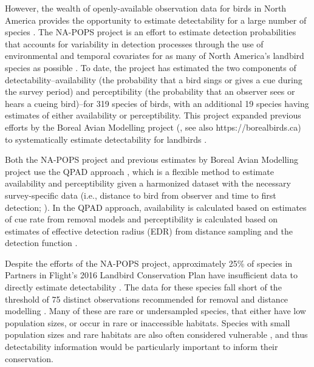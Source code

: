 \documentclass[12pt]{article}
\begin{document}
\par However, the wealth of openly-available observation data for birds in North America provides the opportunity to estimate detectability for a large number of species \citep{bennett_how_2024}. 
The NA-POPS project is an effort to estimate detection probabilities that accounts for variability in detection processes through the use of environmental and temporal covariates for as many of North America’s landbird species as possible \citep{edwards_point_2023}.
To date, the project has estimated the two components of detectability--availability (the probability that a bird sings or gives a cue during the survey period) and perceptibility (the probability that an observer sees or hears a cueing bird)--for 319 species of birds, with an additional 19 species having estimates of either availability or perceptibility. 
This project expanded previous efforts by the Boreal Avian Modelling project (\citet{cumming_toward_2010}, see also https://borealbirds.ca) to systematically estimate detectability for landbirds \citep{solymos_calibrating_2013, solymos_evaluating_2018}.

\par Both the NA-POPS project and previous estimates by Boreal Avian Modelling project use the QPAD approach \citep{solymos_calibrating_2013}, which is a flexible method to estimate availability and perceptibility given a harmonized dataset with the necessary survey-specific data (i.e., distance to bird from observer and time to first detection; \citep{barker_ecological_2015}).
In the QPAD approach, availability is calculated based on estimates of cue rate from removal models \citep{farnsworth_removal_2002, alldredge_time--detection_2007} and perceptibility is calculated based on estimates of effective detection radius (EDR) from distance sampling and the detection function \citep{buckland_introduction_2001}.

\par Despite the efforts of the NA-POPS project, approximately 25\% of species in Partners in Flight’s 2016 Landbird Conservation Plan \citep{rosenberg_partners_2016} have insufficient data to directly estimate detectability \citep{edwards_point_2023}.
The data for these species fall short of the threshold of 75 distinct observations recommended for removal and distance modelling \citep{buckland_introduction_2001, solymos_calibrating_2013}. 
Many of these are rare or undersampled species, that either have low population sizes, or occur in rare or inaccessible habitats.
Species with small population sizes and rare habitats are also often considered vulnerable \citep{davies_synergistic_2004, gray_effects_1989, segura_specialist_2007}, and thus detectability information would be particularly important to inform their conservation.
\end{document}
